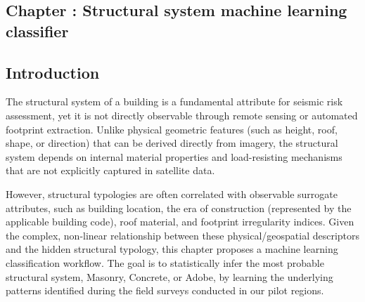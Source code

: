 \graphicspath{{figures_and_references/EELISA_conference/}}

\renewcommand{\chapternametext}{Chapter \thechapter: Structural system machine learning classifier}

\begin{refsection}

\chapter{\chapternametext}

\renewcommand{\headingtextL}{}
\renewcommand{\headingtextR}{\chapternametext}
\begingroup
\flushbottom
\setlength{\parskip}{0pt plus 1fil}%
\localtableofcontents
\endgroup

\begingroup
\flushbottom
\setlength{\parskip}{0pt plus 1fil}%
\locallistoffigures
\endgroup

\newpage
\setcounter{section}{0}

\renewcommand{\sectionnametext}{Introduction}
\renewcommand{\headingtextL}{\chapternametext}
\renewcommand{\headingtextR}{\thesection. \sectionnametext}
\section{\sectionnametext}
The structural system of a building is a fundamental attribute for seismic risk assessment, yet it is not directly observable through remote sensing or automated footprint extraction. Unlike physical geometric features (such as height, roof, shape, or direction) that can be derived directly from imagery, the structural system depends on internal material properties and load-resisting mechanisms that are not explicitly captured in satellite data.

However, structural typologies are often correlated with observable surrogate attributes, such as building location, the era of construction (represented by the applicable building code), roof material, and footprint irregularity indices. Given the complex, non-linear relationship between these physical/geospatial descriptors and the hidden structural typology, this chapter proposes a machine learning classification workflow. The goal is to statistically infer the most probable structural system, Masonry, Concrete, or Adobe, by learning the underlying patterns identified during the field surveys conducted in our pilot regions.


\end{refsection}
